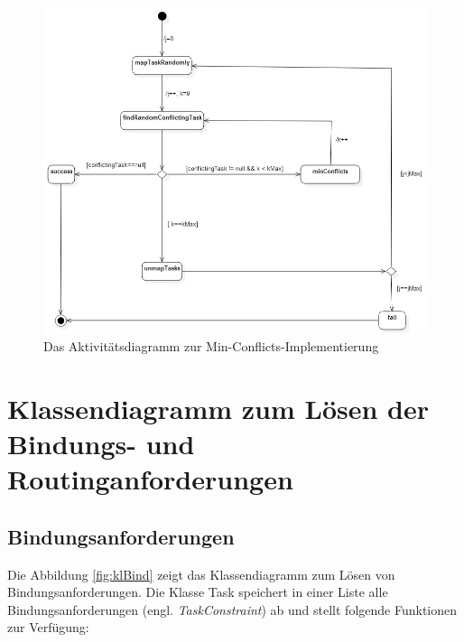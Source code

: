 \begin{figure}[H]\centering
  \includegraphics[width = 150mm]{bilder/minAkti.jpg}
  \caption{Das Aktivitätsdiagramm zur Min-Conflicts-Implementierung}\label{fig:minConflictsAkti}
\end{figure}
\section{Klassendiagramm zum Lösen der Bindungs- und Routinganforderungen}


\subsection{Bindungsanforderungen}\label{bindunganforderung}

Die Abbildung \ref{fig:klBind} zeigt das Klassendiagramm zum Lösen von Bindungsanforderungen. Die Klasse Task speichert in einer Liste alle Bindungsanforderungen (engl. \textit{TaskConstraint}) ab und stellt folgende Funktionen zur Verfügung:

